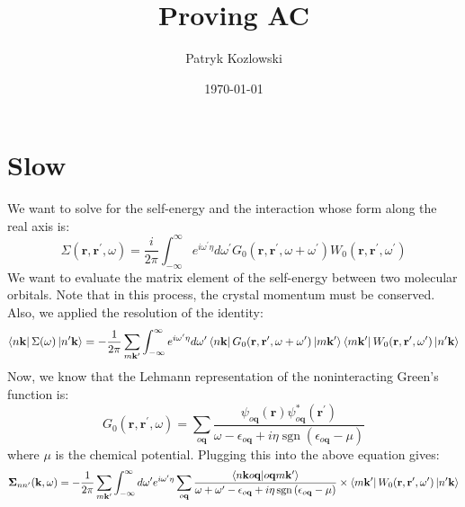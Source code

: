 \documentclass[12pt]{article}
\title{Proving AC}
\author{Patryk Kozlowski}
\date{\today}
\begin{document}
\maketitle
\section{Slow}
We want to solve for the self-energy and the interaction whose form along the real axis is:
\begin{equation}
\Sigma\left(\mathbf{r}, \mathbf{r}^{\prime}, \omega\right)=\frac{i}{2 \pi} \int_{-\infty}^{\infty} e^{i\omega ^{\prime}\eta }d \omega^{\prime} G_{0}\left(\mathbf{r}, \mathbf{r}^{\prime}, \omega+\omega^{\prime}\right) W_{0}\left(\mathbf{r}, \mathbf{r}^{\prime}, \omega^{\prime}\right)
\end{equation}
We want to evaluate the matrix element of the self-energy between two molecular orbitals. Note that in this process, the crystal momentum must be conserved. Also, we applied the resolution of the identity:
\begin{equation}
    \bra{n\mathbf{k}} \Sigma (\omega) \ket{n^\prime\mathbf{k}} = -\frac{1}{2 \pi} \sum_{m\mathbf{k}^{\prime}} \int_{-\infty}^{\infty} e^{i\omega ^{\prime}\eta }d \omega^{\prime} \bra{n\mathbf{k}} G_0(\mathbf{r}, \mathbf{r}^{\prime}, \omega + \omega^{\prime}) \ket{m\mathbf{k}^{\prime}}\bra{m\mathbf{k}^{\prime}}W_0(\mathbf{r}, \mathbf{r}^{\prime}, \omega^{\prime}) \ket{n^\prime\mathbf{k}}
\end{equation}
Now, we know that the Lehmann representation of the noninteracting Green's function is:
\begin{equation}
G_0\left(\mathbf{r}, \mathbf{r}^{\prime}, \omega\right)=\sum_{o \mathbf{q} } \frac{\psi_{o \mathbf{q}}(\mathbf{r}) \psi_{o \mathbf{q}}^{*}\left(\mathbf{r}^{\prime}\right)}{\omega-\epsilon_{o \mathbf{q}}+i \eta \operatorname{sgn}\left(\epsilon_{o \mathbf{q}}-\mu\right)}
\end{equation}
where $\mu$ is the chemical potential. Plugging this into the above equation gives:
\begin{equation}
    \boldsymbol{\Sigma}_{n n^{\prime}}(\mathbf{k}, \omega) = -\frac{1}{2 \pi} \sum_{m\mathbf{k}^{\prime}} \int_{-\infty}^{\infty} d \omega^{\prime} e^{i\omega ^{\prime}\eta }\sum_{o\mathbf{q}}  \frac{\bra{n\mathbf{k} o \mathbf{q}}\ket{ o \mathbf{q} m\mathbf{k}^{\prime}}}{\omega + \omega^{\prime} - \epsilon_{o \mathbf{q}} + i \eta \operatorname{sgn}\left(\epsilon_{o \mathbf{q}}-\mu\right)} \times \bra{m\mathbf{k}^{\prime}}W_0(\mathbf{r}, \mathbf{r}^{\prime}, \omega^{\prime}) \ket{n^{\prime}\mathbf{k}}
\end{equation}
\end{document}

